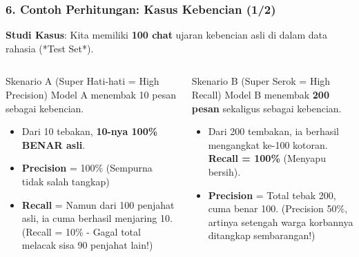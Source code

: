 \documentclass[t,aspectratio=169,xcolor=dvipsnames]{beamer}
\begin{document}
\begin{frame}
    \frametitle{6. Contoh Perhitungan: Kasus Kebencian (1/2)}
    \scriptsize
    \textbf{Studi Kasus}: Kita memiliki \textbf{100 chat} ujaran kebencian asli di dalam data rahasia (*Test Set*).
    \begin{columns}[T]
        \begin{alertblock}{Skenario A (Super Hati-hati = High Precision)}
            Model A menembak 10 pesan sebagai kebencian.
            \begin{itemize}
                \item Dari 10 tebakan, \textbf{10-nya 100\% BENAR asli}.
                \item \textbf{Precision} = 100\% (Sempurna tidak salah tangkap)
                \item \textbf{Recall} = Namun dari 100 penjahat asli, ia cuma berhasil menjaring 10. (Recall = 10\% - Gagal total melacak sisa 90 penjahat lain!)
            \end{itemize}
        \end{alertblock}

        \begin{alertblock}{Skenario B (Super Serok = High Recall)}
            Model B menembak \textbf{200 pesan} sekaligus sebagai kebencian.
            \begin{itemize}
                \item Dari 200 tembakan, ia berhasil mengangkat ke-100 kotoran. \textbf{Recall = 100\%} (Menyapu bersih).
                \item \textbf{Precision} = Total tebak 200, cuma benar 100. (Precision 50\%, artinya setengah warga korbannya ditangkap sembarangan!)
            \end{itemize}
        \end{alertblock}
    \end{columns}
\end{frame}
\end{document}
